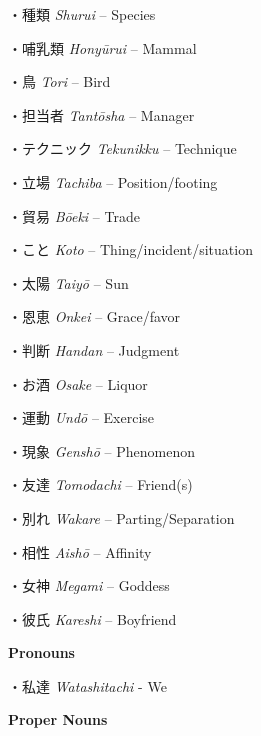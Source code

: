 \par{・種類 \emph{Shurui }– Species }

\par{・哺乳類 \emph{Honyūrui }– Mammal }

\par{・鳥 \emph{Tori }– Bird }

\par{・担当者 \emph{Tantōsha }– Manager }

\par{・テクニック \emph{Tekunikku }– Technique }

\par{・立場 \emph{Tachiba }– Position\slash footing }

\par{・貿易 \emph{Bōeki }– Trade }

\par{・こと \emph{Koto }– Thing\slash incident\slash situation }

\par{・太陽 \emph{Taiyō }– Sun }

\par{・恩恵 \emph{Onkei }– Grace\slash favor }

\par{・判断 \emph{Handan }– Judgment }

\par{・お酒 \emph{Osake }– Liquor }

\par{・運動 \emph{Undō }– Exercise }

\par{・現象 \emph{Genshō }– Phenomenon }

\par{・友達 \emph{Tomodachi }– Friend(s) }

\par{・別れ \emph{Wakare }– Parting\slash Separation }

\par{・相性 \emph{Aishō }– Affinity }

\par{・女神 \emph{Megami }– Goddess }

\par{・彼氏 \emph{Kareshi }– Boyfriend }

\par{\textbf{Pronouns }}

\par{・私達 \emph{Watashitachi }- We }

\par{\textbf{Proper Nouns }}

